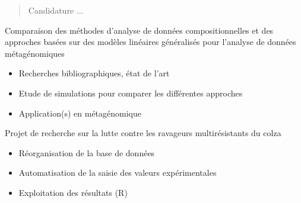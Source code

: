 \documentclass[10pt,a4paper,ragged2e,withhyper]{cv}
\begin{document}
\begin{paracol}{2}
        \newpage
        
        \switchcolumn
        
            \begin{quote}
                Candidature ...
            \end{quote}
        
            
            Comparaison des méthodes d'analyse de données compositionnelles et des approches basées sur des modèles linéaires généralisés pour l'analyse de données métagénomiques
            \smallbreak
            \begin{itemize}
                \item Recherches bibliographiques, état de l'art
                \item Etude de simulations pour comparer les différentes approches
                \item Application(s) en métagénomique 
            \end{itemize}
             \divider
            Projet de recherche sur la lutte contre les ravageurs multirésistants du colza
            \smallbreak
            \begin{itemize}
                \item Réorganisation de la base de données
                \item Automatisation de la saisie des valeurs expérimentales
                \item Exploitation des résultats (R)
            \end{itemize}
            

\end{paracol}
\end{document}
